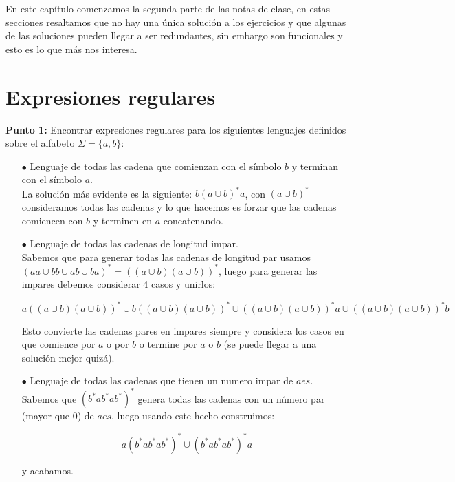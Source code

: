 En este capítulo comenzamos la segunda parte de las notas de clase, en estas secciones resaltamos que no hay una única solución a los ejercicios y que algunas de las soluciones pueden llegar a ser redundantes, sin embargo son funcionales y esto es lo que más nos interesa.

\section{Expresiones regulares}
\textbf{Punto 1: }Encontrar expresiones regulares para los siguientes lenguajes definidos sobre el alfabeto $\Sigma=\{a,b\}:$

\begin{itemize}

    \item[$\bullet$]Lenguaje de todas las cadena que comienzan con el símbolo $b$ y terminan con el símbolo $a$.\\ 

    La solución más evidente es la siguiente: $b(a\cup b)^*a$, con $(a\cup b)^*$ consideramos todas las cadenas y lo que hacemos es forzar que las cadenas comiencen con $b$ y terminen en $a$ concatenando.

    \item[$\bullet$]Lenguaje de todas las cadenas de longitud impar.\\

     Sabemos que para generar todas las cadenas de longitud par usamos $(aa\cup bb\cup ab\cup ba)^*=((a\cup b)(a\cup b))^*$, luego para generar las impares debemos considerar 4 casos y unirlos:

    $$a((a\cup b)(a\cup b))^*\cup b((a\cup b)(a\cup b))^* \cup ((a\cup b)(a\cup b))^*a \cup ((a\cup b)(a\cup b))^*b$$

    Esto convierte las cadenas pares en impares siempre y considera los casos en que comience por $a$ o por $b$ o termine por $a$ o $b$ (se puede llegar a una solución mejor quizá).

    \item[$\bullet$] Lenguaje de todas las cadenas que tienen un numero impar de $aes.$\\ 

    Sabemos que $(b^*ab^*ab^*)^*$ genera todas las cadenas con un número par (mayor que 0) de $aes$, luego usando este hecho construimos:

    $$a(b^*ab^*ab^*)^*\cup (b^*ab^*ab^*)^*a$$

    y acabamos.


\end{itemize}
